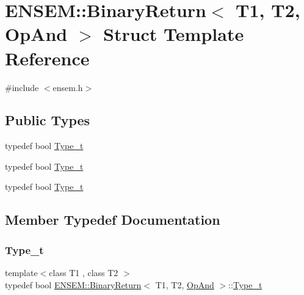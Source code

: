 \hypertarget{structENSEM_1_1BinaryReturn_3_01T1_00_01T2_00_01OpAnd_01_4}{}\section{E\+N\+S\+EM\+:\+:Binary\+Return$<$ T1, T2, Op\+And $>$ Struct Template Reference}
\label{structENSEM_1_1BinaryReturn_3_01T1_00_01T2_00_01OpAnd_01_4}


{\ttfamily \#include $<$ensem.\+h$>$}

\subsection*{Public Types}
\begin{DoxyCompactItemize}
\item 
typedef bool \mbox{\hyperlink{structENSEM_1_1BinaryReturn_3_01T1_00_01T2_00_01OpAnd_01_4_a1efceffe0a3869bf85b2fa8d9b578978}{Type\+\_\+t}}
\item 
typedef bool \mbox{\hyperlink{structENSEM_1_1BinaryReturn_3_01T1_00_01T2_00_01OpAnd_01_4_a1efceffe0a3869bf85b2fa8d9b578978}{Type\+\_\+t}}
\item 
typedef bool \mbox{\hyperlink{structENSEM_1_1BinaryReturn_3_01T1_00_01T2_00_01OpAnd_01_4_a1efceffe0a3869bf85b2fa8d9b578978}{Type\+\_\+t}}
\end{DoxyCompactItemize}


\subsection{Member Typedef Documentation}
\mbox{\label{structENSEM_1_1BinaryReturn_3_01T1_00_01T2_00_01OpAnd_01_4_a1efceffe0a3869bf85b2fa8d9b578978}} 
\subsubsection{\texorpdfstring{Type\_t}{Type\_t}\hspace{0.1cm}{\footnotesize\ttfamily [1/3]}}
{\footnotesize\ttfamily template$<$class T1 , class T2 $>$ \\
typedef bool \mbox{\hyperlink{structENSEM_1_1BinaryReturn}{E\+N\+S\+E\+M\+::\+Binary\+Return}}$<$ T1, T2, \mbox{\hyperlink{structENSEM_1_1OpAnd}{Op\+And}} $>$\+::\mbox{\hyperlink{structENSEM_1_1BinaryReturn_3_01T1_00_01T2_00_01OpAnd_01_4_a1efceffe0a3869bf85b2fa8d9b578978}{Type\+\_\+t}}}

